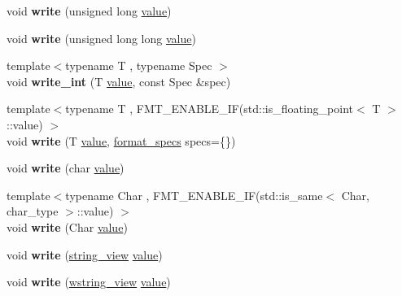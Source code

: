 \begin{DoxyCompactItemize}
void {\bfseries write} (unsigned long \hyperlink{classinternal_1_1value}{value})
\item 
\mbox{\label{classinternal_1_1basic__writer_a41cf2c684ff56d4293a2c41c45d3b8ee}} 
void {\bfseries write} (unsigned long long \hyperlink{classinternal_1_1value}{value})
\item 
\mbox{\label{classinternal_1_1basic__writer_abc7517003a05f959c5c94d280ee6e4d4}} 
{\footnotesize template$<$typename T , typename Spec $>$ }\\void {\bfseries write\+\_\+int} (T \hyperlink{classinternal_1_1value}{value}, const Spec \&spec)
\item 
\mbox{\label{classinternal_1_1basic__writer_adbaf81d39616b8109b4208b636db58b5}} 
{\footnotesize template$<$typename T , F\+M\+T\+\_\+\+E\+N\+A\+B\+L\+E\+\_\+\+I\+F(std\+::is\+\_\+floating\+\_\+point$<$ T $>$\+::value) $>$ }\\void {\bfseries write} (T \hyperlink{classinternal_1_1value}{value}, \hyperlink{structbasic__format__specs}{format\+\_\+specs} specs=\{\})
\item 
\mbox{\label{classinternal_1_1basic__writer_a3e3242dd86ee4d2944f981d91aea2512}} 
void {\bfseries write} (char \hyperlink{classinternal_1_1value}{value})
\item 
\mbox{\label{classinternal_1_1basic__writer_aa3a6f00340464bda0124f86c1500c82e}} 
{\footnotesize template$<$typename Char , F\+M\+T\+\_\+\+E\+N\+A\+B\+L\+E\+\_\+\+I\+F(std\+::is\+\_\+same$<$ Char, char\+\_\+type $>$\+::value) $>$ }\\void {\bfseries write} (Char \hyperlink{classinternal_1_1value}{value})
\item 
\mbox{\label{classinternal_1_1basic__writer_ab34be43b207cbdf0b9d1068137444704}} 
void {\bfseries write} (\hyperlink{classbasic__string__view}{string\+\_\+view} \hyperlink{classinternal_1_1value}{value})
\item 
\mbox{\label{classinternal_1_1basic__writer_ac6c0360cdb82bb3da5b1518bb25e72a2}} 
void {\bfseries write} (\hyperlink{classbasic__string__view}{wstring\+\_\+view} \hyperlink{classinternal_1_1value}{value})

\end{DoxyCompactItemize}
